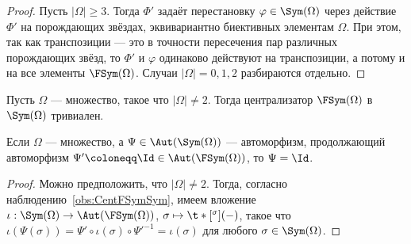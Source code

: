 \documentclass[
	extrafontsizes,
	11pt,
	hyphens,
]{memoir}
\begin{document}
\begin{proof}
Пусть \(\lvert \Omega \rvert \geq 3\). Тогда \(\Phi'\) задаёт перестановку \(\varphi \in \Sym(\Omega)\) через действие \(\Phi'\) на порождающих звёздах, эквивариантно биективных элементам \(\Omega\).
При этом, так как транспозиции --- это в точности пересечения пар различных порождающих звёзд, то \(\Phi'\) и \(\varphi\) одинаково действуют на транспозиции, а потому и на все элементы \(\FSym(\Omega)\).
Случаи \(\lvert \Omega \rvert = 0, 1, 2\) разбираются отдельно.
\end{proof}



\begin{observation} \label{obs:CentFSymSym}
Пусть \(\Omega\) --- множество, такое что \(\lvert \Omega \rvert \neq 2\).
Тогда централизатор \(\FSym(\Omega)\) в \(\Sym(\Omega)\) тривиален.
\end{observation}

\begin{lemma} \label{lem:AutFinSymTriv}
Если \(\Omega\) --- множество, а \(\Psi \in \Aut(\Sym(\Omega))\) --- автоморфизм, продолжающий автоморфизм \(\Psi' \coloneqq \Id \in \Aut(\FSym(\Omega))\), то \(\Psi = \Id\).
\end{lemma}

\begin{proof}
Можно предположить, что \(\lvert \Omega \rvert \neq 2\).
Тогда,
согласно наблюдению~\ref{obs:CentFSymSym},
имеем вложение
\(\iota : \Sym(\Omega) \to \Aut(\FSym(\Omega))\),
\(\sigma \mapsto \t*[^{\sigma}]{(-)}{}\),
такое что
\(\iota(\Psi(\sigma)) = \Psi' \circ \iota(\sigma) \circ \Psi'^{-1} = \iota(\sigma)\) для любого \(\sigma \in \Sym(\Omega)\).
\end{proof}
\end{document}
